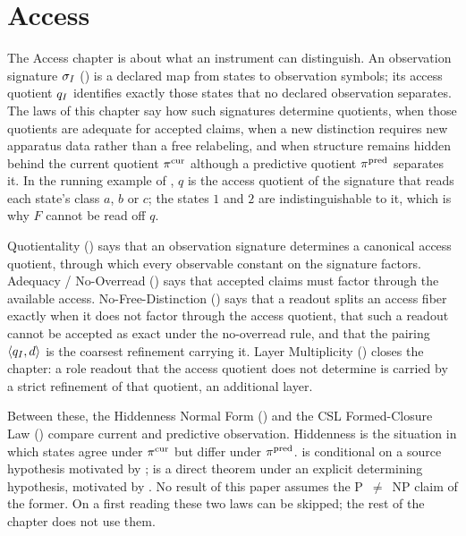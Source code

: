 \section{Access}\label{sec:access}

The Access chapter is about what an instrument can distinguish.  An
observation signature \(\sigma_I\) () is a
declared map from states to observation symbols; its access quotient
\(q_I\) identifies exactly those states that no declared
observation separates.  The laws of this chapter say how such
signatures determine quotients, when those quotients are adequate for
accepted claims, when a new distinction requires new apparatus data
rather than a free relabeling, and when structure remains hidden behind
the current quotient \(\pi^{\mathrm{cur}}\) although a predictive quotient
\(\pi^{\mathrm{pred}}\) separates it.  In the running example of ,
\(q\) is the access quotient of the signature that reads each state's
class \(a\), \(b\) or \(c\); the states \(1\) and \(2\) are
indistinguishable to it, which is why \(F\) cannot be read off \(q\).

Quotientality () says that an observation signature
determines a canonical access quotient, through which every observable
constant on the signature factors.  Adequacy / No-Overread ()
says that accepted claims must factor through the available access.
No-Free-Distinction () says that a readout splits an access
fiber exactly when it does not factor through the access quotient, that
such a readout cannot be accepted as exact under the no-overread rule,
and that the pairing \(\langle q_I,d\rangle\) is the coarsest
refinement carrying it.  Layer Multiplicity () closes the
chapter: a role readout that the access quotient does not determine is
carried by a strict refinement of that quotient, an additional layer.

Between these, the Hiddenness Normal Form () and the CSL
Formed-Closure Law () compare current and predictive
observation.  Hiddenness is the situation in which states agree under
\(\pi^{\mathrm{cur}}\) but differ under \(\pi^{\mathrm{pred}}\).   is conditional on a
source hypothesis motivated by \citet{Tsiokos2026PvNP};  is
a direct theorem under an explicit determining hypothesis, motivated by
\citet{Tsiokos2026CSL}.  No result of this paper assumes the
P~\(\neq\)~NP claim of the former.  On a first reading these two laws
can be skipped; the rest of the chapter does not use them.

